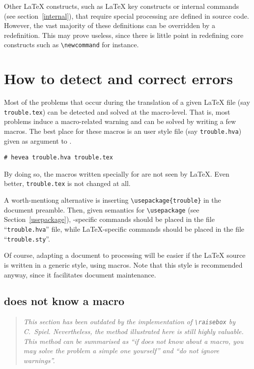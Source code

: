 Other \LaTeX{} constructs, such as
\LaTeX{} key constructs or \hevea{} internal commands (see section~\ref{internal}),
that require special processing are defined
in \hevea{} source code.
However, the vast majority of these definitions can be overridden by a
redefinition.
This may prove useless, since there is little point in
redefining core constructs such as \verb+\newcommand+ for instance.

\section{How to detect and correct errors}\label{trouble}

Most of the problems that occur during the translation of a given
\LaTeX{} file (say \verb+trouble.tex+) can be detected and solved at
the macro-level. That is, most problems induce a macro-related warning
and can be solved by writing a few
macros. The best place for these macros is an user style file (say
\texttt{trouble.hva}) given as
argument to \hevea.
\begin{verbatim}
# hevea trouble.hva trouble.tex
\end{verbatim}
By doing so, the macros written specially for \hevea{} are not
seen by \LaTeX. Even better, \verb+trouble.tex+ is not changed
at all.

A worth-mentiong alternative is inserting \verb+\usepackage{trouble}+
in the document preamble. Then, given \hevea{} semantics for
\verb+\usepackage+ (see Section~\ref{usepackage}),
\hevea{}-specific commands should be placed in
the file ``\texttt{trouble.hva}'' file, while \LaTeX{}-specific commands
should be placed in the file ``\texttt{trouble.sty}''.

Of course, adapting a document to \hevea{} processing
will be easier if the \LaTeX{} source is written in a
generic style, using macros.
Note that this style is recommended anyway, since it facilitates
document maintenance.

\subsection{\hevea{} does not know a macro}\label{dontknow}
\begin{quote}\em
This section has been outdated by the implementation of
\verb+\raisebox+ by C.~Spiel. Nevertheless, the method illustrated here is still highly valuable. This method can be summarised as ``if \hevea{} does not know about a macro, you may solve the problem a simple one yourself'' and ``do not ignore warnings''.
\end{quote}


